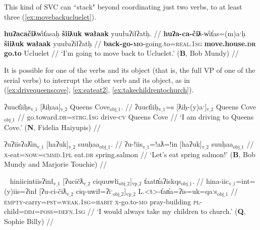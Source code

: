 This kind of SVC can ``stack" beyond coordinating just two verbs, to at least three (\ref{ex:movebackucluelet}).

\begin{comment}
\ex \label{ex:onlygotostore}
\begingl
\glpreamble \textbf{ʔanasiła}ʔi \textbf{kuw̓iła} \textbf{ʔucačiƛ} makuwił. //
\gla \textbf{ʔana-siła}=!iˑ \textbf{kuw̓iła} \textbf{ʔu-ca-čiƛ} makuwił //
\glb \textbf{only-do}=\textsc{cmmd.2sg} \textbf{go.ahead} \textbf{\textsc{x}-go.to-\textsc{mo}} store //
\glft `Just go to the store.' (\textbf{C}, \textit{tupaat} Julia Lucas) //
\endgl
\xe
\end{comment}

\ex \label{ex:movebackucluelet}
\begingl
\glpreamble \textbf{huʔacačiƛ}w̓it̓asaḥ \textbf{šiiƛuk} \textbf{wałaak} yuułuʔiłʔatḥ. //
\gla \textbf{huʔa-ca-čiƛ}-w̓it̓as=(m)aˑḥ \textbf{šiiƛuk} \textbf{wałaak} yuułuʔiłʔatḥ //
\glb \textbf{back-go-\textsc{mo}}-going.to=\textsc{real.1sg} \textbf{move.house.\textsc{dr}} \textbf{go.to} Ucluelet //
\glft `I'm going to move back to Ucluelet.' (\textbf{B}, Bob Mundy) //
\endgl
\xe

It is possible for one of the verbs and its object (that is, the full VP of one of the serial verbs) to interrupt the other verb and its object, as in (\ref{ex:drivequeenscove}, \ref{ex:eateat2}, \ref{ex:takechildrentochurch}).

\ex \label{ex:drivequeenscove}
\begingl
\glpreamble ʔuuct̓iiḥs$_{\text{v\_1}}$ [ƛiḥaa]$_{\text{v\_2}}$ Queens Cove$_{\text{obj\_1}}$. //
\gla ʔuuct̓iiḥ$_{\text{v\_1}}$=s [ƛiḥ-(y)aˑ]$_{\text{v\_2}}$ Queens Cove$_{\text{obj\_1}}$ //
\glb go.toward.\textsc{dr}=\textsc{strg.1sg} drive-\textsc{cv} Queens Cove //
\glft `I am driving to Queens Cove.' (\textbf{N}, Fidelia Haiyupis) //
\endgl
\xe

\ex \label{ex:eateat2}
\begingl
\glpreamble ʔuʔiisʔaƛ̓in$_{\text{v\_1}}$ [haʔuk]$_{\text{v\_2}}$ suuḥaa$_{\text{obj\_1}}$. //
\gla ʔu-!iis$_{\text{v\_1}}$=!aƛ=!in [haʔuk]$_{\text{v\_2}}$ suuḥaa$_{\text{obj\_1}}$ //
\glb \textsc{x}-eat=\textsc{now}=\textsc{cmmd.1pl} eat.\textsc{dr} spring.salmon //
\glft `Let's eat spring salmon!' (\textbf{B}, Bob Mundy and Marjorie Touchie) //
\endgl
\xe

\ex~ \label{ex:takechildrentochurch}
\begingl
\glpreamble hiniicintiisʔinł$_{\text{v\_1}}$ [ʔucičƛ$_{\text{v\_2}}$ ciquuwłi$_{\text{obj\_2}}$]$_{\text{vp\_2}}$ t̓aatn̓aʔiskqs$_{\text{obj\_1}}$. //
\gla hina-iic$_{\text{v\_1}}$=int=(y)iis=ʔinł [ʔu-ci-čiƛ$_{\text{v\_2}}$ ciq-uwił=ʔiˑ$_{\text{obj\_2}}$]$_{\text{vp\_2}}$ L.<t>-t̓an̓a=ʔis=uk=qaˑs$_{\text{obj\_1}}$  //
\glb \textsc{empty}-carry=\textsc{pst}=\textsc{weak.1sg}=\textsc{habit} \textsc{x}-go.to-\textsc{mo} pray-building \textsc{pl}-child=\textsc{dim}=\textsc{poss}=\textsc{defn.1sg} //
\glft `I would always take my children to church.' (\textbf{Q}, Sophie Billy) //
\endgl
\xe


